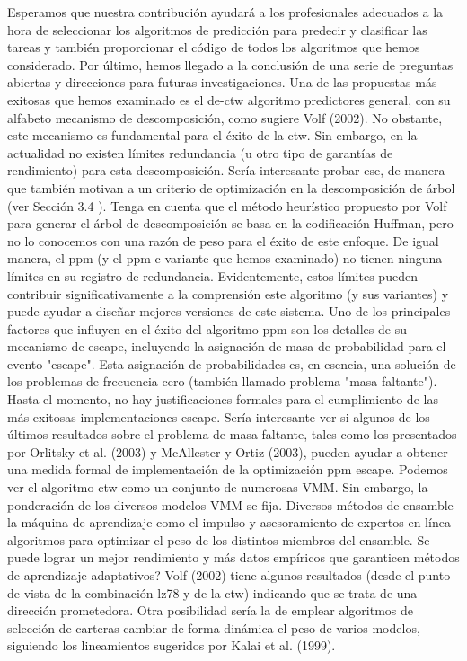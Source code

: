 Esperamos que nuestra contribución ayudará a los profesionales adecuados a la hora de seleccionar los algoritmos de predicción para predecir y clasificar las tareas y también proporcionar el código de todos los algoritmos que hemos considerado. Por último, hemos llegado a la conclusión de una serie de preguntas abiertas y direcciones para futuras investigaciones.
Una de las propuestas más exitosas que hemos examinado  es el de-ctw algoritmo predictores general, con su alfabeto  mecanismo de descomposición, como sugiere Volf (2002).  No obstante, este mecanismo es fundamental para el éxito de la ctw. Sin embargo, en la actualidad no existen límites redundancia (u otro tipo de garantías de rendimiento) para esta descomposición. Sería interesante probar ese, de manera que también motivan a un criterio de optimización en la descomposición de árbol (ver Sección 3.4 ).  Tenga en cuenta que el método heurístico propuesto por Volf para generar el árbol de descomposición se basa en la codificación Huffman, pero no lo conocemos con una razón de peso para el éxito de este enfoque.
De igual manera, el ppm (y el ppm-c variante que hemos examinado) no tienen ninguna límites en su registro de redundancia. Evidentemente, estos límites pueden contribuir significativamente a la comprensión este algoritmo (y sus variantes) y puede ayudar a diseñar mejores versiones de este sistema.
Uno de los principales factores que influyen en el éxito del algoritmo ppm son los detalles de su mecanismo de escape, incluyendo la asignación de masa de probabilidad para el evento "escape". Esta asignación de probabilidades es, en esencia, una solución de los problemas de frecuencia cero (también llamado problema "masa faltante").  Hasta el momento, no hay justificaciones formales para el cumplimiento de las más exitosas implementaciones escape. Sería interesante ver si algunos de los últimos resultados sobre el problema de masa faltante, tales como los presentados por Orlitsky et al. (2003) y McAllester y Ortiz (2003), pueden ayudar a obtener una medida formal de implementación de la optimización ppm escape.
Podemos ver el algoritmo ctw  como un conjunto de numerosas VMM. Sin embargo, la ponderación de los diversos modelos VMM se fija. Diversos métodos de ensamble la máquina de aprendizaje como el impulso y asesoramiento de expertos en línea algoritmos para optimizar el peso de los distintos miembros del ensamble. Se puede lograr un mejor rendimiento y más datos empíricos que garanticen  métodos de aprendizaje adaptativos? Volf (2002) tiene algunos resultados (desde el punto de vista de la combinación lz78 y de la ctw) indicando que se trata de una dirección prometedora. Otra posibilidad sería la de emplear algoritmos de selección de carteras cambiar de forma dinámica el peso de varios modelos, siguiendo los lineamientos sugeridos por Kalai et al. (1999).


































